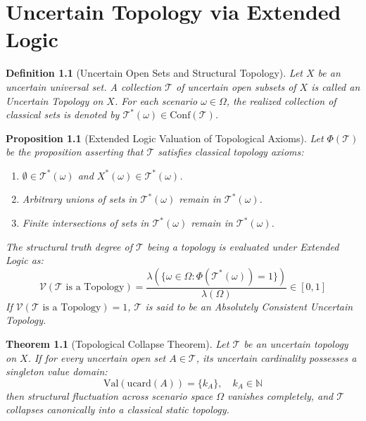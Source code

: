 \documentclass[a4paper,14pt, twoside]{memoir}
\newtheorem{definition}{Definition}[chapter]
\newtheorem{theorem}{Theorem}[chapter]
\newtheorem{proposition}{Proposition}[chapter]
\begin{document}
	\chapter{Uncertain Topology via Extended Logic}
	
	\begin{definition}[Uncertain Open Sets and Structural Topology]
		Let $X$ be an uncertain universal set. A collection $\mathcal{T}$ of uncertain open subsets of $X$ is called an \emph{Uncertain Topology} on $X$. For each scenario $\omega \in \Omega$, the realized collection of classical sets is denoted by $\mathcal{T}^*(\omega) \in \mathrm{Conf}(\mathcal{T})$.
	\end{definition}
	
	\begin{proposition}[Extended Logic Valuation of Topological Axioms]
		Let $\Phi(\mathcal{T})$ be the proposition asserting that $\mathcal{T}$ satisfies classical topology axioms:
		\begin{enumerate}[label=\roman*)]
			\item $\emptyset \in \mathcal{T}^*(\omega)$ and $X^*(\omega) \in \mathcal{T}^*(\omega)$.
			\item Arbitrary unions of sets in $\mathcal{T}^*(\omega)$ remain in $\mathcal{T}^*(\omega)$.
			\item Finite intersections of sets in $\mathcal{T}^*(\omega)$ remain in $\mathcal{T}^*(\omega)$.
		\end{enumerate}
		The structural truth degree of $\mathcal{T}$ being a topology is evaluated under Extended Logic as:
		\[
		\mathcal{V}(\mathcal{T} \text{ is a Topology}) = \frac{\lambda(\{\omega \in \Omega : \Phi(\mathcal{T}^*(\omega)) = 1\})}{\lambda(\Omega)} \in [0, 1]
		\]
		If $\mathcal{V}(\mathcal{T} \text{ is a Topology}) = 1$, $\mathcal{T}$ is said to be an Absolutely Consistent Uncertain Topology.
	\end{proposition}
	
	\begin{theorem}[Topological Collapse Theorem]
		Let $\mathcal{T}$ be an uncertain topology on $X$. If for every uncertain open set $A \in \mathcal{T}$, its uncertain cardinality possesses a singleton value domain:
		\[
		\mathrm{Val}(\mathrm{ucard}(A)) = \{k_A\}, \quad k_A \in \mathbb{N}
		\]
		then structural fluctuation across scenario space $\Omega$ vanishes completely, and $\mathcal{T}$ collapses canonically into a classical static topology.
	\end{theorem}
	
\end{document}
